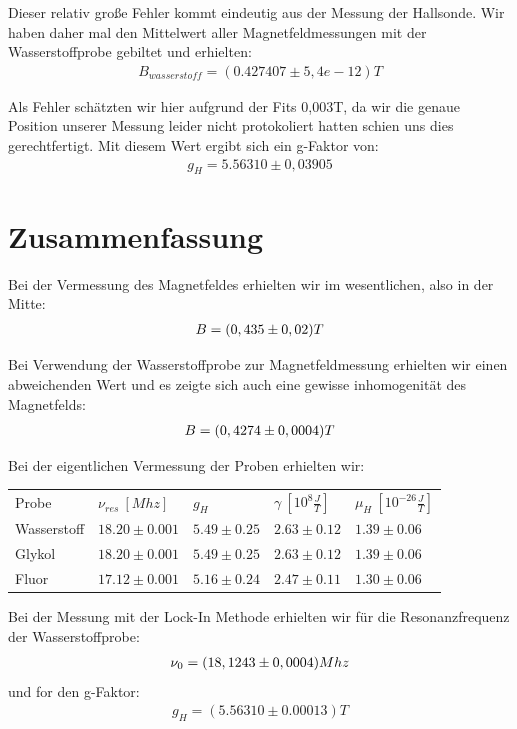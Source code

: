 \documentclass[12pt]{article}
\begin{document}
Dieser relativ große Fehler kommt eindeutig aus der Messung der Hallsonde. Wir haben daher mal den Mittelwert aller Magnetfeldmessungen mit der Wasserstoffprobe gebiltet und erhielten:
\begin{align}
 B_{wasserstoff}= (0.427407 \pm 5,4e-12) T
\end{align}

Als Fehler schätzten wir hier aufgrund der Fits 0,003T, da wir die genaue Position unserer Messung leider nicht protokoliert hatten schien uns dies gerechtfertigt. Mit diesem Wert ergibt sich ein g-Faktor von:
\begin{align}
 g_H =  5.56310 \pm  0,03905
\end{align}

\section{Zusammenfassung}

Bei der Vermessung des Magnetfeldes erhielten wir im wesentlichen, also in der Mitte:
\begin{align}
 \notag B=(0,435 \pm 0,02) T
\end{align}

Bei Verwendung der Wasserstoffprobe zur Magnetfeldmessung erhielten wir einen abweichenden Wert und es zeigte sich auch eine gewisse inhomogenität des Magnetfelds:
\begin{align}
 \notag B=(0,4274 \pm 0,0004) T
\end{align}

Bei der eigentlichen Vermessung der Proben erhielten wir:
\begin{center}
\begin{tabular}{l|llll}
Probe & $\nu_{res}~[Mhz]$ & $g_H$ & $\gamma~[10^8\frac{J}{T}]$ & $\mu_H~[10^{-26}\frac{J}{T}]$ \\ 
Wasserstoff & $18.20\pm0.001$ & $5.49\pm0.25$ & $2.63\pm0.12$ & $1.39\pm0.06$ \\ 
Glykol & $18.20\pm0.001$ & $5.49\pm0.25$ & $2.63\pm0.12$ & $1.39\pm0.06$ \\ 
Fluor & $17.12\pm0.001$ & $5.16\pm0.24$ & $2.47\pm0.11$ & $1.30\pm0.06$
\end{tabular}
\end{center}

Bei der Messung mit der Lock-In Methode erhielten wir für die Resonanzfrequenz der Wasserstoffprobe:
\begin{align}
 \notag \nu_0= (18,1243\pm0,0004)Mhz
\end{align}
und for den g-Faktor:
\begin{align}
 g_H =  (5.56310 \pm 0.00013) T
\end{align}
\end{document}
